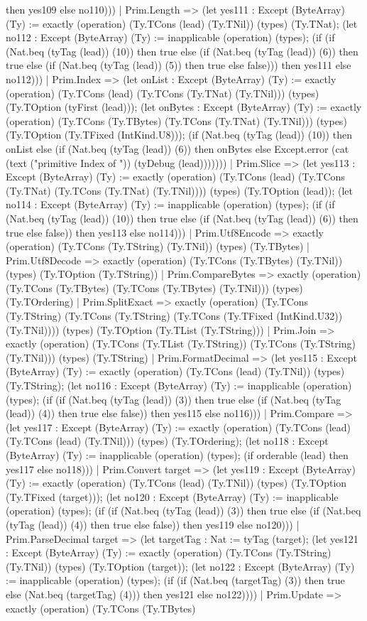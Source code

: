 \documentclass[11pt]{article}
\begin{document}
then yes109 else no110))) | Prim.Length => (let yes111 : Except (ByteArray) (Ty) := exactly (operation) (Ty.TCons (lead) (Ty.TNil)) (types) (Ty.TNat); (let no112 : Except (ByteArray) (Ty) := inapplicable (operation) (types); (if (if (Nat.beq (tyTag (lead)) (10)) then true else (if (Nat.beq (tyTag (lead)) (6)) then true else (if (Nat.beq (tyTag (lead)) (5)) then true else false))) then yes111 else no112))) | Prim.Index => (let onList : Except (ByteArray) (Ty) := exactly (operation) (Ty.TCons (lead) (Ty.TCons (Ty.TNat) (Ty.TNil))) (types) (Ty.TOption (tyFirst (lead))); (let onBytes : Except (ByteArray) (Ty) := exactly (operation) (Ty.TCons (Ty.TBytes) (Ty.TCons (Ty.TNat) (Ty.TNil))) (types) (Ty.TOption (Ty.TFixed (IntKind.U8))); (if (Nat.beq (tyTag (lead)) (10)) then onList else (if (Nat.beq (tyTag (lead)) (6)) then onBytes else Except.error (cat (text ("primitive Index of ")) (tyDebug (lead))))))) | Prim.Slice => (let yes113 : Except (ByteArray) (Ty) := exactly (operation) (Ty.TCons (lead) (Ty.TCons (Ty.TNat) (Ty.TCons (Ty.TNat) (Ty.TNil)))) (types) (Ty.TOption (lead)); (let no114 : Except (ByteArray) (Ty) := inapplicable (operation) (types); (if (if (Nat.beq (tyTag (lead)) (10)) then true else (if (Nat.beq (tyTag (lead)) (6)) then true else false)) then yes113 else no114))) | Prim.Utf8Encode => exactly (operation) (Ty.TCons (Ty.TString) (Ty.TNil)) (types) (Ty.TBytes) | Prim.Utf8Decode => exactly (operation) (Ty.TCons (Ty.TBytes) (Ty.TNil)) (types) (Ty.TOption (Ty.TString)) | Prim.CompareBytes => exactly (operation) (Ty.TCons (Ty.TBytes) (Ty.TCons (Ty.TBytes) (Ty.TNil))) (types) (Ty.TOrdering) | Prim.SplitExact => exactly (operation) (Ty.TCons (Ty.TString) (Ty.TCons (Ty.TString) (Ty.TCons (Ty.TFixed (IntKind.U32)) (Ty.TNil)))) (types) (Ty.TOption (Ty.TList (Ty.TString))) | Prim.Join => exactly (operation) (Ty.TCons (Ty.TList (Ty.TString)) (Ty.TCons (Ty.TString) (Ty.TNil))) (types) (Ty.TString) | Prim.FormatDecimal => (let yes115 : Except (ByteArray) (Ty) := exactly (operation) (Ty.TCons (lead) (Ty.TNil)) (types) (Ty.TString); (let no116 : Except (ByteArray) (Ty) := inapplicable (operation) (types); (if (if (Nat.beq (tyTag (lead)) (3)) then true else (if (Nat.beq (tyTag (lead)) (4)) then true else false)) then yes115 else no116))) | Prim.Compare => (let yes117 : Except (ByteArray) (Ty) := exactly (operation) (Ty.TCons (lead) (Ty.TCons (lead) (Ty.TNil))) (types) (Ty.TOrdering); (let no118 : Except (ByteArray) (Ty) := inapplicable (operation) (types); (if orderable (lead) then yes117 else no118))) | Prim.Convert target => (let yes119 : Except (ByteArray) (Ty) := exactly (operation) (Ty.TCons (lead) (Ty.TNil)) (types) (Ty.TOption (Ty.TFixed (target))); (let no120 : Except (ByteArray) (Ty) := inapplicable (operation) (types); (if (if (Nat.beq (tyTag (lead)) (3)) then true else (if (Nat.beq (tyTag (lead)) (4)) then true else false)) then yes119 else no120))) | Prim.ParseDecimal target => (let targetTag : Nat := tyTag (target); (let yes121 : Except (ByteArray) (Ty) := exactly (operation) (Ty.TCons (Ty.TString) (Ty.TNil)) (types) (Ty.TOption (target)); (let no122 : Except (ByteArray) (Ty) := inapplicable (operation) (types); (if (if (Nat.beq (targetTag) (3)) then true else (Nat.beq (targetTag) (4))) then yes121 else no122)))) | Prim.Update => exactly (operation) (Ty.TCons (Ty.TBytes) 
\end{document}
